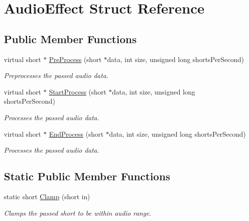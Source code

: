 \hypertarget{struct_audio_effect}{}\section{Audio\+Effect Struct Reference}
\label{struct_audio_effect}
\subsection*{Public Member Functions}
\begin{DoxyCompactItemize}
\item 
virtual short $\ast$ \hyperlink{struct_audio_effect_a68a10e8078d43f86399cb72ca5419e2e}{Pre\+Process} (short $\ast$data, int size, unsigned long shorts\+Per\+Second)
\begin{DoxyCompactList}\small\item\em Preprocesses the passed audio data. \end{DoxyCompactList}\item 
virtual short $\ast$ \hyperlink{struct_audio_effect_ab2646610037686bc72533eecd2411c09}{Start\+Process} (short $\ast$data, int size, unsigned long shorts\+Per\+Second)
\begin{DoxyCompactList}\small\item\em Processes the passed audio data. \end{DoxyCompactList}\item 
virtual short $\ast$ \hyperlink{struct_audio_effect_a94cbc22a743bebbae125a60dda7a8b6d}{End\+Process} (short $\ast$data, int size, unsigned long shorts\+Per\+Second)
\begin{DoxyCompactList}\small\item\em Processes the passed audio data. \end{DoxyCompactList}\end{DoxyCompactItemize}
\subsection*{Static Public Member Functions}
\begin{DoxyCompactItemize}
\item 
static short \hyperlink{struct_audio_effect_a5d36494f57fe50ba0ec4f49f3d1eeac4}{Clamp} (short in)
\begin{DoxyCompactList}\small\item\em Clamps the passed short to be within audio range. \end{DoxyCompactList}\end{DoxyCompactItemize}


